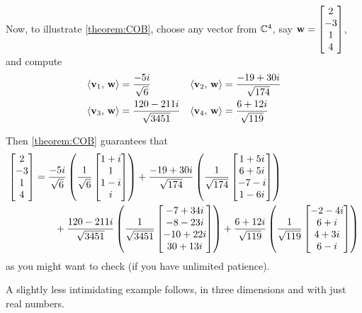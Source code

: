 \documentclass{ximera}
\begin{document}
\begin{example}
\begin{feedback}[correct]
    Now, to illustrate \ref{theorem:COB}, choose any vector from $\mathbb{C}^{4}$, say $\mathbf{w}=\begin{bmatrix}2\\-3\\1\\4\end{bmatrix}$, and compute
    \begin{align*}
      \left\langle\mathbf{v}_1,\,\mathbf{w}\right\rangle&=\frac{-5i}{\sqrt{6}}&
                                                                 \left\langle\mathbf{v}_2,\,\mathbf{w}\right\rangle&=\frac{-19+30i}{\sqrt{174}}\\
      \left\langle\mathbf{v}_3,\,\mathbf{w}\right\rangle&=\frac{120-211i}{\sqrt{3451}}&
                                                                         \left\langle\mathbf{v}_4,\,\mathbf{w}\right\rangle&=\frac{6+12i}{\sqrt{119}}
    \end{align*}
    
    Then \ref{theorem:COB} guarantees that
    \begin{align*}
      \begin{bmatrix}2\\-3\\1\\4\end{bmatrix}&=
                               \frac{-5i}{\sqrt{6}}\left(\frac{1}{\sqrt{6}}\begin{bmatrix}1+i\\1\\1-i\\i\end{bmatrix}\right)+
      \frac{-19+30i}{\sqrt{174}}\left(\frac{1}{\sqrt{174}}\begin{bmatrix}1+5i\\6+5i\\-7-i\\1-6i\end{bmatrix}\right)\\
                             &\quad\quad+
                               \frac{120-211i}{\sqrt{3451}}\left(\frac{1}{\sqrt{3451}}\begin{bmatrix}-7+34i\\-8-23i\\-10+22i\\30+13i\end{bmatrix}\right)+
      \frac{6+12i}{\sqrt{119}}\left(\frac{1}{\sqrt{119}}\begin{bmatrix}-2-4i\\6+i\\4+3i\\6-i\end{bmatrix}\right)
    \end{align*}
    as you might want to check (if you have unlimited patience).
  \end{feedback}
\end{example}

A slightly less intimidating example follows, in three dimensions and
with just real numbers.
\end{document}
